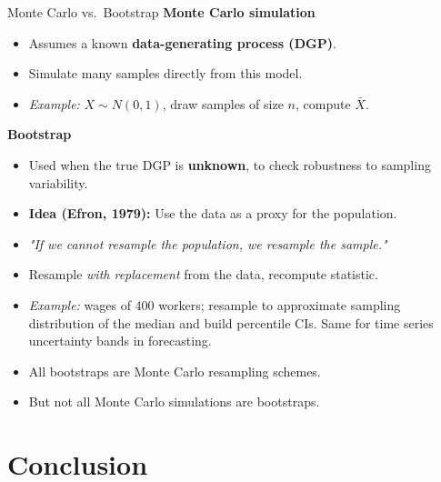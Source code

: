 \documentclass{beamer}
\begin{document}
\begin{frame}{Monte Carlo vs.\ Bootstrap}
\small
\textbf{Monte Carlo simulation}
\begin{itemize}
  \item Assumes a known \textbf{data-generating process (DGP)}.
  \item Simulate many samples directly from this model.
  \item \emph{Example:} $X \sim N(0,1)$, draw samples of size $n$, compute $\bar X$.
\end{itemize}

\pause
\textbf{Bootstrap}
\begin{itemize}
  \item Used when the true DGP is \textbf{unknown}, to check robustness to sampling variability.
  \item \textbf{Idea (Efron, 1979):} Use the data as a proxy for the population.  
  \item \textit{"If we cannot resample the population, we resample the sample." }
  \item Resample \emph{with replacement} from the data, recompute statistic. 
  \item \emph{Example:} wages of 400 workers; resample to approximate sampling distribution of the median and build percentile CIs. Same for time series uncertainty bands in forecasting.
\end{itemize}

\pause
\begin{itemize}
  \item All bootstraps are Monte Carlo resampling schemes.
  \item But not all Monte Carlo simulations are bootstraps.
\end{itemize}
\end{frame}


\section{Conclusion}
\end{document}
